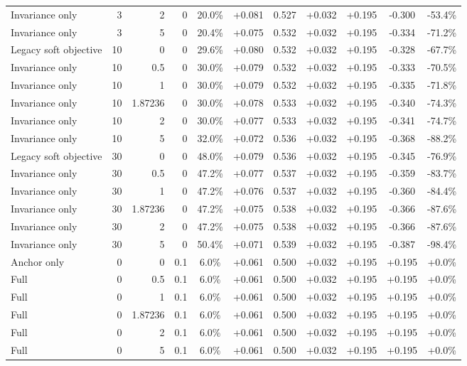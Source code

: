 \begin{table}[htbp]
\begin{tabular}{lrrrccccccc}
Invariance only & 3 & 2 & 0 & 20.0\% & +0.081 & 0.527 & +0.032 & +0.195 & -0.300 & -53.4\% \\
Invariance only & 3 & 5 & 0 & 20.4\% & +0.075 & 0.532 & +0.032 & +0.195 & -0.334 & -71.2\% \\
Legacy soft objective & 10 & 0 & 0 & 29.6\% & +0.080 & 0.532 & +0.032 & +0.195 & -0.328 & -67.7\% \\
Invariance only & 10 & 0.5 & 0 & 30.0\% & +0.079 & 0.532 & +0.032 & +0.195 & -0.333 & -70.5\% \\
Invariance only & 10 & 1 & 0 & 30.0\% & +0.079 & 0.532 & +0.032 & +0.195 & -0.335 & -71.8\% \\
Invariance only & 10 & 1.87236 & 0 & 30.0\% & +0.078 & 0.533 & +0.032 & +0.195 & -0.340 & -74.3\% \\
Invariance only & 10 & 2 & 0 & 30.0\% & +0.077 & 0.533 & +0.032 & +0.195 & -0.341 & -74.7\% \\
Invariance only & 10 & 5 & 0 & 32.0\% & +0.072 & 0.536 & +0.032 & +0.195 & -0.368 & -88.2\% \\
Legacy soft objective & 30 & 0 & 0 & 48.0\% & +0.079 & 0.536 & +0.032 & +0.195 & -0.345 & -76.9\% \\
Invariance only & 30 & 0.5 & 0 & 47.2\% & +0.077 & 0.537 & +0.032 & +0.195 & -0.359 & -83.7\% \\
Invariance only & 30 & 1 & 0 & 47.2\% & +0.076 & 0.537 & +0.032 & +0.195 & -0.360 & -84.4\% \\
Invariance only & 30 & 1.87236 & 0 & 47.2\% & +0.075 & 0.538 & +0.032 & +0.195 & -0.366 & -87.6\% \\
Invariance only & 30 & 2 & 0 & 47.2\% & +0.075 & 0.538 & +0.032 & +0.195 & -0.366 & -87.6\% \\
Invariance only & 30 & 5 & 0 & 50.4\% & +0.071 & 0.539 & +0.032 & +0.195 & -0.387 & -98.4\% \\
Anchor only & 0 & 0 & 0.1 & 6.0\% & +0.061 & 0.500 & +0.032 & +0.195 & +0.195 & +0.0\% \\
Full & 0 & 0.5 & 0.1 & 6.0\% & +0.061 & 0.500 & +0.032 & +0.195 & +0.195 & +0.0\% \\
Full & 0 & 1 & 0.1 & 6.0\% & +0.061 & 0.500 & +0.032 & +0.195 & +0.195 & +0.0\% \\
Full & 0 & 1.87236 & 0.1 & 6.0\% & +0.061 & 0.500 & +0.032 & +0.195 & +0.195 & +0.0\% \\
Full & 0 & 2 & 0.1 & 6.0\% & +0.061 & 0.500 & +0.032 & +0.195 & +0.195 & +0.0\% \\
Full & 0 & 5 & 0.1 & 6.0\% & +0.061 & 0.500 & +0.032 & +0.195 & +0.195 & +0.0\% \\

\end{tabular}
\end{table}

